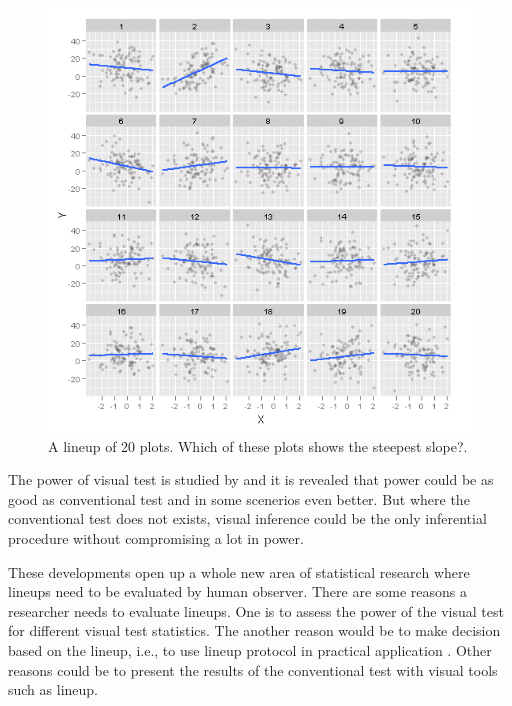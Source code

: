 \documentclass[11pt]{article}
\begin{document}
\begin{figure}[htbp] 
   \centering
   \includegraphics[width=6.5in]{plot_turk2_100_450_12_3.png} 
   \caption{A lineup of 20 plots. Which of these plots shows the steepest slope?.}
   \label{fig:lineup_turk}
\end{figure}


The power of visual test is studied by \cite{majumder:2013} and it is revealed that power could be as good as conventional test and in some scenerios even better. But where the conventional test does not exists, visual inference could be the only inferential procedure without compromising a lot in power. 

These developments open up a whole new area of statistical research where lineups need to be evaluated by human observer. There are some reasons a researcher needs to evaluate lineups. One is to assess the power of the visual test \citep{heike:2012} for different visual test statistics. The another reason would be to make decision based on the lineup, i.e., to use lineup protocol in practical application \citep{niladri:2012}. Other reasons could be to present the results of the conventional test with visual tools such as lineup.  



\end{document}
